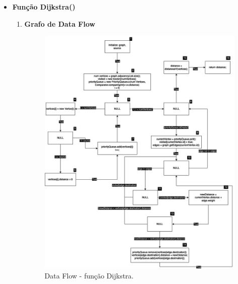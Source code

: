 \documentclass{article}
\begin{document}
\begin{itemize}
    \item      \textbf{Função Dijkstra()}
    
       
    \begin{enumerate}
        
        \item \textbf{Grafo de Data Flow}
    \begin{figure}[H]
    \centering
    \includegraphics[width=\textwidth]{Images/DataFlowDijkstra.png}
    \caption{Data Flow - função Dijkstra.} 
    \label{fig:DataFlow-Dijkstra}

    \end{figure}
    

\end{enumerate}
\end{itemize}
\end{document}
